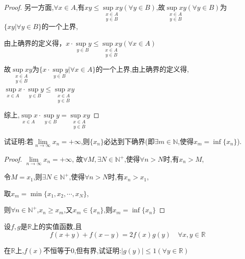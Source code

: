 \begin{proof}
    另一方面,$\forall x\in A$,有$xy \le \underset{y \in B}{\underset{x \in A}{\sup xy}}(\forall y \in B)$,故$\underset{y \in B}{\underset{x \in A}{\sup xy}}(\forall y \in B)$为$\{xy|\forall y \in B\}$的一个上界,

    由上确界的定义得，$x \cdot \underset{y\in B}{\sup y} \le \underset{y \in B}{\underset{x \in A}{\sup xy}}(\forall x\in A)$

    故$\underset{y \in B}{\underset{x \in A}{\sup xy}}$为$\{x \cdot \underset{y\in B}{\sup y}|\forall x\in A\}$的一个上界,由上确界的定义得,$\underset{x\in A}{\sup x} \cdot \underset{y \in B}{\sup y} \le \underset{y \in B}{\underset{x \in A}{\sup xy}}$

    综上,$\underset{x\in A}{\sup x} \cdot \underset{y \in B}{\sup y} = \underset{y \in B}{\underset{x \in A}{\sup xy}}$
\end{proof}

\begin{exercise}
    试证明:若$\underset{n \to \infty}{\lim}x_n=+\infty$,则$\{x_n\}$必达到下确界(即$\exists m \in \mathbb{N}$,使得$x_m=\inf \{x_n\}$). 
\end{exercise} 

\begin{proof}
    $\underset{n \to \infty}{\lim}x_n=+\infty$,
    故$\forall M,\exists N \in \mathbb{N^+}$,使得$\forall n>N$时,有$x_n>M$,

    令$M=x_1$,则$\exists N \in \mathbb{N^+}$,使得$\forall n>N$时,有$x_n>x_1$,

    取$x_m=\min \{x_1,x_2,\cdots,x_N\}$,

    则$\forall n \in \mathbb{N^+}$,$x_n\ge x_m$,又$x_m \in \{x_n\}$,则$x_m=\inf \{x_n\}$
\end{proof}

\vspace{4pt}
\begin{exercise}
    设$f,g$是$\mathbb{R}$上的实值函数,且
    \begin{equation*}
        f(x+y)+f(x-y)=2f(x)g(y)\quad \forall x,y\in \mathbb{R}
    \end{equation*}

    在$\mathbb{R}$上,$f(x)$不恒等于0,但有界,试证明:$|g(y)|\le 1 (\forall y \in \mathbb{R})$
\end{exercise}

